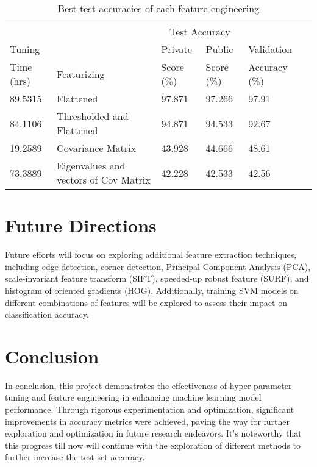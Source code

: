 \documentclass{article}
\begin{document}
\begin{table}[h]
  \caption{Best test accuracies of each feature engineering}
  \label{results}
  \centering
  \begin{tabular}{llllll}
    \toprule
    &  & \multicolumn{2}{c}{Test Accuracy}  & \\             
    \cmidrule(r){3-4}
    Tuning &  & Private &  Public & Validation \\   
    Time (hrs) & Featurizing & Score (\%) & Score (\%) & Accuracy (\%)\\
    \midrule
    89.5315 & Flattened & 97.871 & 97.266 & 97.91\\
    84.1106  & Thresholded and Flattened & 94.871 & 94.533 & 92.67 \\
    19.2589 & Covariance Matrix & 43.928 & 44.666 & 48.61 \\
    73.3889  & Eigenvalues and vectors of Cov Matrix & 42.228 & 42.533 & 42.56\\

    \bottomrule
  \end{tabular}
\end{table}



\section{Future Directions}
Future efforts will focus on exploring additional feature extraction techniques, including edge detection, corner detection, Principal Component Analysis (PCA), scale-invariant feature transform (SIFT), speeded-up robust feature (SURF), and histogram of oriented gradients (HOG). Additionally, training SVM models on different combinations of features will be explored to assess their impact on classification accuracy.

\section{Conclusion}
In conclusion, this project demonstrates the effectiveness of hyper parameter tuning and feature engineering in enhancing machine learning model performance. Through rigorous experimentation and optimization, significant improvements in accuracy metrics were achieved, paving the way for further exploration and optimization in future research endeavors. It's noteworthy that this progress till now will continue with the exploration of different methods to further increase the test set accuracy. 
\end{document}
